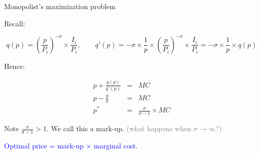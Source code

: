 \documentclass[notes,11pt, aspectratio=169, xcolor=table]{beamer}
\newcommand{\blue}[1]{\textcolor{blue}{#1}}
\newenvironment{wideitemize}{\itemize\addtolength{\itemsep}{10pt}}{\enditemize}
\begin{document}
\begin{frame}{Monopolist's maximization problem}

    \begin{wideitemize}
            \item Recall:

    \begin{equation*}
        q(p) = \left( \frac{p}{P_i} \right)^{-\sigma} \times \frac{I_i}{P_i}, \qquad q'(p) = -\sigma \times \frac{1}{p} \times \left( \frac{p}{P_i} \right)^{-\sigma} \times \frac{I_i}{P_i}  = -\sigma \times \frac{1}{p} \times q(p)
    \end{equation*}

    \item<2-> Hence: 

    \begin{eqnarray*}
        p + \frac{q(p)}{q'(p)} &=& MC \\
        p - \frac{p}{\sigma} &=& MC \\
p^* &=& \frac{\sigma}{\sigma -1}\times MC 
    \end{eqnarray*}

    \item<3-> Note $\frac{\sigma}{\sigma -1} > 1$. We call this a mark-up. 
    { \scriptsize \qquad \textcolor{gray}{(what happens when $\sigma \to \infty$?)} }
    \item<4-> \blue{Optimal price = mark-up $\times$ marginal cost.}

    
    \end{wideitemize}
\end{frame}
\end{document}
